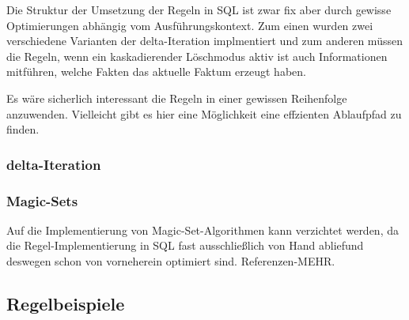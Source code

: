 Die Struktur der Umsetzung der Regeln in SQL ist zwar fix aber durch gewisse Optimierungen abhängig vom Ausführungskontext. Zum einen wurden zwei verschiedene Varianten der delta-Iteration implmentiert und zum anderen müssen die Regeln, wenn ein kaskadierender Löschmodus aktiv ist auch Informationen mitführen, welche Fakten das aktuelle Faktum erzeugt haben.

Es wäre sicherlich interessant die Regeln in einer gewissen Reihenfolge anzuwenden. Vielleicht gibt es hier eine Möglichkeit eine effzienten Ablaufpfad zu finden.

\subsubsection{delta-Iteration}


\subsubsection{Magic-Sets}
Auf die Implementierung von Magic-Set-Algorithmen kann verzichtet werden, da die Regel-Implementierung in SQL fast ausschließlich von Hand abliefund deswegen schon von vorneherein optimiert sind.
Referenzen-MEHR.


\subsection{Regelbeispiele}

